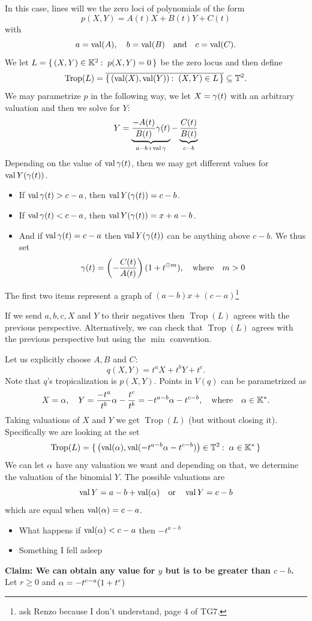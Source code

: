 \documentclass[12pt]{memoir}
\DeclareMathOperator{\val}{val}
\DeclareMathOperator{\Trop}{Trop}
\begin{document}
In this case, lines will we the zero loci of polynomials of the form 
$$p(X,Y)=A(t)X+B(t)Y+C(t)$$
with 
$$a=\val(A),\quad b=\val(B)\word{and}c=\val(C).$$
We let $L=\set{(X,Y)\in\bK^2\:\ p(X,Y)=0}$ be the zero locus and then define
$$\Trop(L)=\ov{\set{(\val(X),\val(Y))\:\ (X,Y)\in L}}\subseteq\bT^2.$$
We may parametrize $p$ in the following way, we let $X=\gamma(t)$ with an arbitrary valuation and then we solve for $Y$:
$$Y=\underbrace{\frac{-A(t)}{B(t)}\ga(t)}_{a-b+\val\ga}-\underbrace{\frac{C(t)}{B(t)}}_{c-b}$$ 
 Depending on the value of $\val\ga(t)$, then we may get different values for $\val Y(\ga(t))$. 
\begin{itemize}
    \itemsep=-0.4em 
    \item If $\val\ga(t)>c-a$, then $\val Y(\ga(t))=c-b$.
    \item If $\val\ga(t)<c-a$, then $\val Y(\ga(t))=x+a-b$.
    \item And if $\val\ga(t)=c-a$ then $\val Y(\ga(t))$ can be anything above $c-b$. We thus set 
    $$\gamma(t)=\left(-\frac{C(t)}{A(t)}\right)(1+t^{\odot m}),\quad\text{where}\quad m>0$$
\end{itemize}
The first two items represent a graph of $(a-b)x+(c-a)$\footnote{ask Renzo because I don't understand, page 4 of TG7.}
\begin{Rmk}
If we send $a,b,c,X$ and $Y$ to their negatives then $\Trop(L)$ agrees with the previous perspective. Alternatively, we can check that $\Trop(L)$ agrees with the previous perspective but using the $\min$ convention.
\end{Rmk}
\begin{Ex}
    Let us explicitly choose $A,B$ and $C$:
    $$q(X,Y)=t^aX+t^bY+t^c.$$
    Note that $q$'s tropicalization is $p(X,Y)$.
    Points in $V(q)$ can be parametrized as 
    $$X=\alpha,\quad Y=\frac{-t^a}{t^b}\alpha-\frac{t^c}{t^b}=-t^{a-b}\alpha-t^{c-b},\quad\text{where}\quad\alpha\in\mathbb{K}^\ast.$$
    Taking valuations of $X$ and $Y$ we get $\Trop(L)$ (but without closing it). Specifically we are looking at the set 
    $$\Trop(L)=\set{\left(\val(\al),\val(-t^{a-b}\al-t^{c-b})\right)\in\bT^2\:\ \al\in\bK^\ast}$$
    We can let $\alpha$ have any valuation we want and depending on that, we determine the valuation of the binomial $Y$. The possible valuations are 
    $$\val Y=a-b+\val(\al)\word{or}\val Y =c-b$$
    which are equal when $\val(\al)=c-a$. 
    \begin{itemize}
        \item What happens if $\val(\al)<c-a$ then $-t^{a-b}$
        \item Something I fell asleep 
    \end{itemize}
    \textbf{Claim: We can obtain any value for $y$ but is to be greater than $c-b$.}
    Let $r\geq 0$ and $\alpha=-t^{c-a}(1+t^r)$
\end{Ex}
\end{document}
